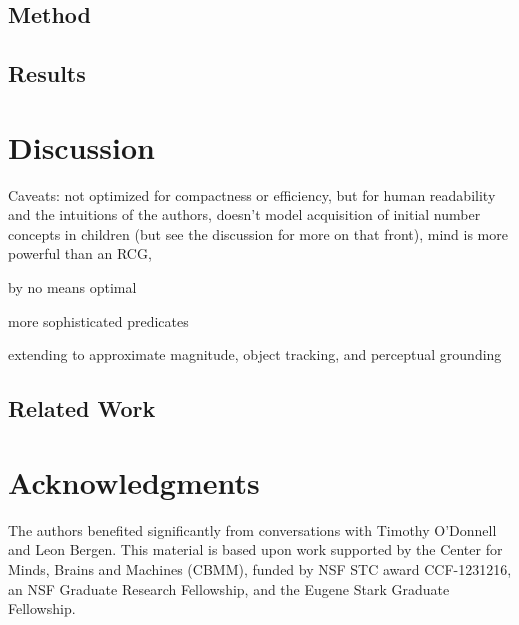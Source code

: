 \documentclass[10pt,letterpaper]{article}
\begin{document}
\subsection{Method}

\subsection{Results}

\section{Discussion}

Caveats: not optimized for compactness or efficiency, but for human
readability and the intuitions of the authors, doesn't model
acquisition of initial number concepts in children (but see the
discussion for more on that front), mind is more powerful than an RCG,

by no means optimal

more sophisticated predicates

extending to approximate magnitude, object tracking, and perceptual grounding

\subsection{Related Work}

\section{Acknowledgments}

The authors benefited significantly from conversations with Timothy
O'Donnell and Leon Bergen. This material is based upon work supported
by the Center for Minds, Brains and Machines (CBMM), funded by NSF STC
award CCF-1231216, an NSF Graduate Research Fellowship, and the Eugene
Stark Graduate Fellowship.




\setlength{\bibleftmargin}{.125in}
\setlength{\bibindent}{-\bibleftmargin}

\end{document}

